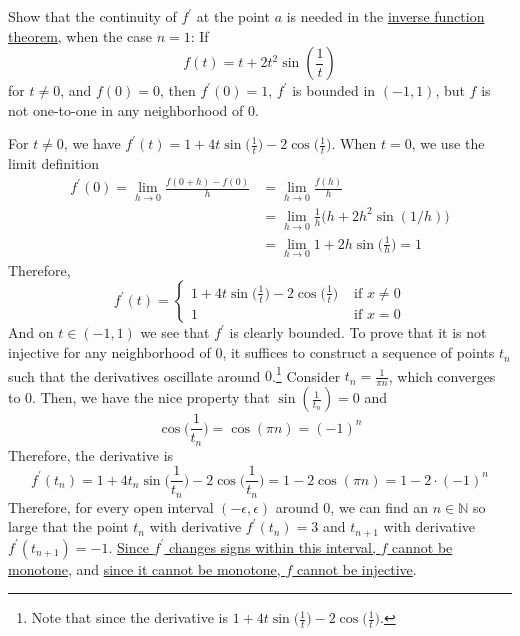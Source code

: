 	\begin{exercise}[Rudin 9.16]
		Show that the continuity of $f^\prime$ at the point $a$ is needed in the \hyperref[thm:inverse-function-theorem]{inverse function theorem}, when the case $n=1$: If
		\begin{equation}
			f(t)=t+2t^2\sin\left(\frac{1}{t}\right)
		\end{equation}
		for $t\neq0$, and $f(0)=0$, then $f^\prime(0)=1$, $f^\prime$ is bounded in $(-1,1)$, but $f$ is not one-to-one in any neighborhood of $0$.
	\end{exercise}
	\begin{solution} 
		For $t \neq 0$, we have $f^\prime (t) = 1 + 4t \sin\big(\frac{1}{t} \big) - 2 \cos \big( \frac{1}{t} \big)$. When $t = 0$, we use the limit definition 
		\begin{align}
			f^\prime (0) = \lim_{h \to 0} \frac{f(0 + h) - f(0)}{h} 
				& = \lim_{h \to 0} \frac{f(h)}{h} \\ 
				& = \lim_{h \to 0} \frac{1}{h} \big( h + 2 h^2 \sin(1/h) \big) \\ 
				& = \lim_{h \to 0} 1 + 2h \sin \big(\frac{1}{h} \big) = 1
		\end{align}
		Therefore, 
		\begin{equation}
			f^\prime (t) = \begin{cases} 
				1 + 4t \sin\big(\frac{1}{t} \big) - 2 \cos \big( \frac{1}{t} \big) & \text{ if } x \neq 0 \\ 
				1 & \text{ if } x = 0
			\end{cases}
		\end{equation}
		And on $t \in (-1, 1)$ we see that $f^\prime$ is clearly bounded. To prove that it is not injective for any neighborhood of $0$, it suffices to construct a sequence of points $t_n$ such that the derivatives oscillate around $0$.\footnote{Note that since the derivative is $1 + 4t \sin\big(\frac{1}{t}\big) - 2 \cos\big( \frac{1}{t} \big)$.} Consider $t_n = \frac{1}{\pi n}$, which converges to $0$. Then, we have the nice property that $\sin(\frac{1}{t_n}) = 0$ and 
		\begin{equation}
			\cos\bigg( \frac{1}{t_n} \bigg) = \cos(\pi n) = (-1)^n
		\end{equation}
		Therefore, the derivative is 
		\begin{equation}
			f^\prime (t_n) = 1 + 4t_n \sin\bigg( \frac{1}{t_n} \bigg) - 2 \cos \bigg( \frac{1}{t_n} \bigg) = 1 - 2 \cos(\pi n) = 1 - 2 \cdot (-1)^n
		\end{equation} 
		Therefore, for every open interval $(-\epsilon, \epsilon)$ around $0$, we can find an $n \in \mathbb{N}$ so large that the point $t_n$ with derivative $f^\prime (t_n) = 3$ and $t_{n+1}$ with derivative $f^\prime (t_{n+1}) = -1$. \hyperref[real-thm:der_mono_func]{Since $f^\prime$ changes signs within this interval, $f$ cannot be monotone}, and \hyperref[real-thm:cont_inj_monotone]{since it cannot be monotone, $f$ cannot be injective}. 
	\end{solution}

